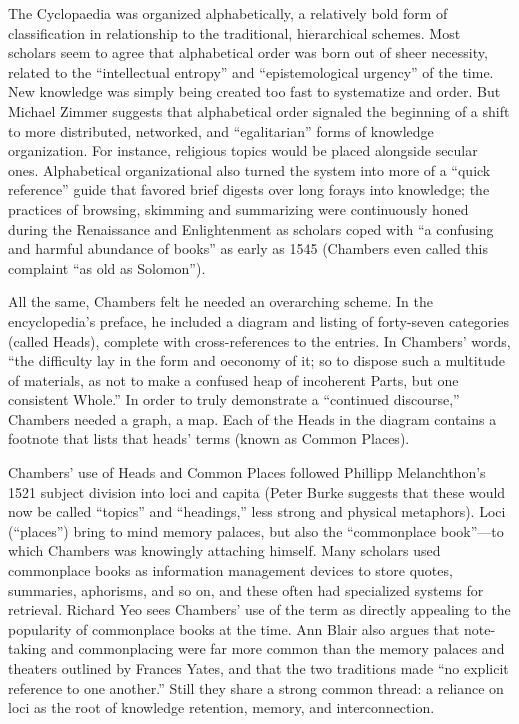 The Cyclopaedia was organized alphabetically, a relatively bold form of classification in relationship to the traditional, hierarchical schemes. Most scholars seem to agree that alphabetical order was born out of sheer necessity, related to the “intellectual entropy” and “epistemological urgency” of the time.  New knowledge was simply being created too fast to systematize and order. But Michael Zimmer suggests that alphabetical order signaled the beginning of a shift to more distributed, networked, and “egalitarian” forms of knowledge organization.  For instance, religious topics would be placed alongside secular ones. Alphabetical organizational also turned the system into more of a “quick reference” guide that favored brief digests over long forays into knowledge; the practices of browsing, skimming and summarizing were continuously honed during the Renaissance and Enlightenment as scholars coped with “a confusing and harmful abundance of books” as early as 1545 (Chambers even called this complaint “as old as Solomon”). 

All the same, Chambers felt he needed an overarching scheme. In the encyclopedia’s preface, he included a diagram and listing of forty-seven categories (called Heads), complete with cross-references to the entries. In Chambers’ words, “the difficulty lay in the form and oeconomy of it; so to dispose such a multitude of materials, as not to make a confused heap of incoherent Parts, but one consistent Whole.”  In order to truly demonstrate a “continued discourse,” Chambers needed a graph, a map. Each of the Heads in the diagram contains a footnote that lists that heads’ terms (known as Common Places). 

Chambers’ use of Heads and Common Places followed Phillipp Melanchthon’s 1521 subject division into loci and capita (Peter Burke suggests that these would now be called “topics” and “headings,” less strong and physical metaphors).  Loci (“places”) bring to mind memory palaces, but also the “commonplace book”—to which Chambers was knowingly attaching himself. Many scholars used commonplace books as information management devices to store quotes, summaries, aphorisms, and so on, and these often had specialized systems for retrieval. Richard Yeo sees Chambers’ use of the term as directly appealing to the popularity of commonplace books at the time.  Ann Blair also argues that note-taking and commonplacing were far more common than the memory palaces and theaters outlined by Frances Yates, and that the two traditions made “no explicit reference to one another.”  Still they share a strong common thread: a reliance on loci as the root of knowledge retention, memory, and interconnection.

